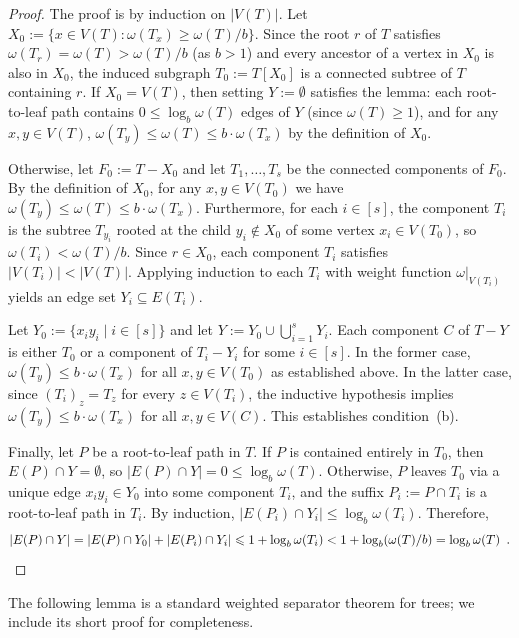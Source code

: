 \documentclass{patmorin}
\renewcommand{\ge}{\geqslant}
\renewcommand{\le}{\leqslant}
\begin{document}
\begin{proof}
  The proof is by induction on $|V(T)|$.  Let $X_0:=\{x\in V(T):\omega(T_x)\ge \omega(T)/b\}$.  Since the root $r$ of $T$ satisfies $\omega(T_r)=\omega(T)>\omega(T)/b$ (as $b>1$) and every ancestor of a vertex in $X_0$ is also in $X_0$, the induced subgraph $T_0:=T[X_0]$ is a connected subtree of $T$ containing $r$.  If $X_0=V(T)$, then setting $Y:=\emptyset$ satisfies the lemma: each root-to-leaf path contains $0 \le \log_b\omega(T)$ edges of $Y$ (since $\omega(T)\ge 1$), and for any $x,y\in V(T)$, $\omega(T_y)\le \omega(T)\le b\cdot\omega(T_x)$ by the definition of $X_0$.

  Otherwise, let $F_0:=T-X_0$ and let $T_1,\ldots,T_s$ be the connected components of $F_0$.  By the definition of $X_0$, for any $x,y\in V(T_0)$ we have $\omega(T_y)\le\omega(T)\le b\cdot\omega(T_x)$.  Furthermore, for each $i\in[s]$, the component $T_i$ is the subtree $T_{y_i}$ rooted at the child $y_i\notin X_0$ of some vertex $x_i\in V(T_0)$, so $\omega(T_i)<\omega(T)/b$.  Since $r\in X_0$, each component $T_i$ satisfies $|V(T_i)|<|V(T)|$.  Applying induction to each $T_i$ with weight function $\omega|_{V(T_i)}$ yields an edge set $Y_i\subseteq E(T_i)$.

  Let $Y_0:=\{x_iy_i\mid i\in[s]\}$ and let $Y:=Y_0\cup\bigcup_{i=1}^s Y_i$.  Each component $C$ of $T-Y$ is either $T_0$ or a component of $T_i-Y_i$ for some $i\in[s]$.  In the former case, $\omega(T_y)\le b\cdot\omega(T_x)$ for all $x,y\in V(T_0)$ as established above.  In the latter case, since $(T_i)_z = T_z$ for every $z\in V(T_i)$, the inductive hypothesis implies $\omega(T_y)\le b\cdot\omega(T_x)$ for all $x,y\in V(C)$.  This establishes condition~(b).

  Finally, let $P$ be a root-to-leaf path in $T$.  If $P$ is contained entirely in $T_0$, then $E(P)\cap Y = \emptyset$, so $|E(P)\cap Y| = 0 \le \log_b\omega(T)$.  Otherwise, $P$ leaves $T_0$ via a unique edge $x_iy_i\in Y_0$ into some component $T_i$, and the suffix $P_i := P\cap T_i$ is a root-to-leaf path in $T_i$.  By induction, $|E(P_i)\cap Y_i|\le\log_b\omega(T_i)$.  Therefore,
  \[  
    |E(P)\cap Y|
      = |E(P)\cap Y_0| + |E(P_i)\cap Y_i|
      \le 1+\log_b\omega(T_i)
      < 1+\log_b(\omega(T)/b)
      = \log_b\omega(T) \enspace . \qedhere 
  \]
\end{proof}


The following lemma is a standard weighted separator theorem for trees; we include its short proof for completeness.
\end{document}
